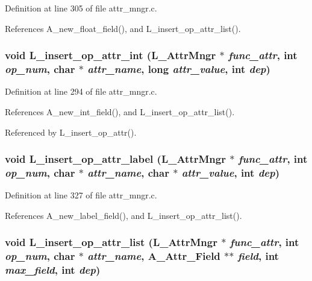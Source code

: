 Definition at line 305 of file attr\_\-mngr.c.

References A\_\-new\_\-float\_\-field(), and L\_\-insert\_\-op\_\-attr\_\-list().
\subsubsection{\setlength{\rightskip}{0pt plus 5cm}void L\_\-insert\_\-op\_\-attr\_\-int (\bf{L\_\-Attr\-Mngr} $\ast$ {\em func\_\-attr}, int {\em op\_\-num}, char $\ast$ {\em attr\_\-name}, long {\em attr\_\-value}, int {\em dep})}\label{attr__mngr_8c_72d2e485b9aed008ec48ba1a098d5b18}




Definition at line 294 of file attr\_\-mngr.c.

References A\_\-new\_\-int\_\-field(), and L\_\-insert\_\-op\_\-attr\_\-list().

Referenced by L\_\-insert\_\-op\_\-attr().
\subsubsection{\setlength{\rightskip}{0pt plus 5cm}void L\_\-insert\_\-op\_\-attr\_\-label (\bf{L\_\-Attr\-Mngr} $\ast$ {\em func\_\-attr}, int {\em op\_\-num}, char $\ast$ {\em attr\_\-name}, char $\ast$ {\em attr\_\-value}, int {\em dep})}\label{attr__mngr_8c_9b1b50a8a64362c5a646a9bc4633153f}




Definition at line 327 of file attr\_\-mngr.c.

References A\_\-new\_\-label\_\-field(), and L\_\-insert\_\-op\_\-attr\_\-list().
\subsubsection{\setlength{\rightskip}{0pt plus 5cm}void L\_\-insert\_\-op\_\-attr\_\-list (\bf{L\_\-Attr\-Mngr} $\ast$ {\em func\_\-attr}, int {\em op\_\-num}, char $\ast$ {\em attr\_\-name}, \bf{A\_\-Attr\_\-Field} $\ast$$\ast$ {\em field}, int {\em max\_\-field}, int {\em dep})}\label{attr__mngr_8c_e018e737cddb70d6447bd5be0527cda6}




